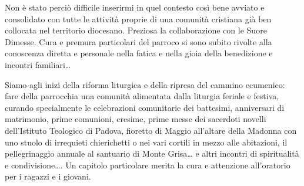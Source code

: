 Non è stato perciò difficile inserirmi in quel contesto così bene avviato e consolidato con tutte le attività proprie di una comunità cristiana già ben collocata nel territorio diocesano. Preziosa la collaborazione con le Suore Dimesse. Cura e premura particolari del parroco si sono subito rivolte alla conoscenza diretta e personale nella fatica e nella gioia della benedizione e incontri familiari… 

Siamo agli inizi della riforma liturgica e della ripresa del cammino ecumenico: fare della parrocchia una comunità alimentata dalla liturgia feriale e festiva, curando specialmente le celebrazioni comunitarie dei battesimi, anniversari di matrimonio, prime comunioni, cresime, prime messe dei sacerdoti novelli dell’Istituto Teologico di Padova, fioretto di Maggio all’altare della Madonna con uno stuolo di irrequieti chierichetti o nei vari cortili in mezzo alle abitazioni, il pellegrinaggio annuale al santuario di Monte Grisa… e altri incontri di spiritualità e condivisione…. Un capitolo particolare merita la cura e attenzione all’oratorio per i ragazzi e i giovani. 

